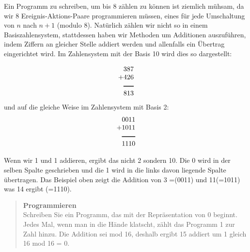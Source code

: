 \bigskip




Ein Programm zu schreiben, um bis 8 zählen zu können ist ziemlich mühsam, da wir 8 Ereignis-Aktions-Paare programmieren müssen, eines für jede Umschaltung von $n$ nach $n+1$ (modulo 8). 
Natürlich zählen wir nicht so in einem Basiszahlensystem, stattdessen haben wir Methoden um Additionen auszuführen, indem Ziffern an gleicher Stelle addiert werden und allenfalls ein Übertrag eingerichtet wird. 
Im Zahlensystem mit der Basis 10 wird dies so dargestellt:

\begin{displaymath}
\begin{array}{r}
387\\
+426\\
\rule[1pt]{1.5em}{1pt}\\
813\\
\end{array}
\end{displaymath}
und auf die gleiche Weise im Zahlensystem mit Basis 2:
\begin{displaymath}
\begin{array}{r}
0011\\
+1011\\
\rule[1pt]{2em}{1pt}\\
1110\\
\end{array}
\end{displaymath}

Wenn wir 1 und 1 addieren, ergibt das nicht 2 sondern 10. Die 0 wird in der selben Spalte geschrieben und die 1 wird in die links davon liegende Spalte übertragen. Das Beispiel oben zeigt die Addition von 3 =(0011) und 11(=1011) was 14 ergibt (=1110).

\begin{quote}
\textbf{Programmieren}\\
Schreiben Sie ein Programm, das mit der Repräsentation von 0 beginnt. Jedes Mal, wenn man in die Hände klatscht, zählt das Programm 1 zur Zahl hinzu. Die Addition sei mod 16, deshalb ergibt 15 addiert um 1 gleich 16 mod 16 = 0.
\end{quote}

